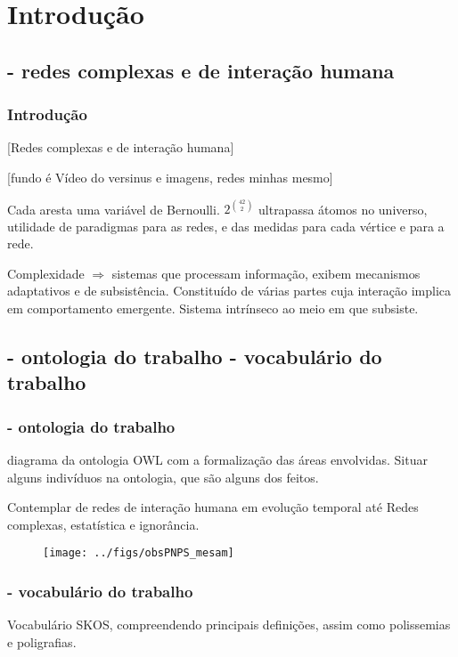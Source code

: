 \documentclass[10pt]{beamer}
\begin{document}
\section{Introdução}
\subsection{- redes complexas e de interação humana}
\begin{frame}
\frametitle{Introdução}
[Redes complexas e de interação humana]


[fundo é Vídeo do versinus e imagens, redes minhas mesmo]

\vspace{1cm}

Cada aresta uma variável de Bernoulli.
$2^{42 \choose 2}$ ultrapassa átomos no universo,
utilidade de paradigmas para as redes,
e das medidas para cada vértice e para a rede.

\vspace{1cm}

Complexidade $\Rightarrow$ sistemas que processam informação,
exibem mecanismos adaptativos e de subsistência.
Constituído de várias partes cuja interação implica
em comportamento emergente. Sistema intrínseco ao meio
em que subsiste.
\end{frame}

\subsection{- ontologia do trabalho \;\; - vocabulário do trabalho}
\begin{frame}
\frametitle{- ontologia do trabalho}
diagrama da ontologia OWL com a formalização das
áreas envolvidas. Situar alguns indivíduos na ontologia,
que são alguns dos feitos.

Contemplar de redes de interação humana em evolução temporal até Redes complexas, estatística e ignorância.
\begin{figure}[!h]
    \texttt{[image: ../figs/obsPNPS\_mesam]}
        \label{fig:mesam}
\end{figure}
\end{frame}


\begin{frame}
\frametitle{- vocabulário do trabalho}
Vocabulário SKOS, compreendendo principais definições, assim como polissemias e poligrafias.
\end{frame}
\end{document}

